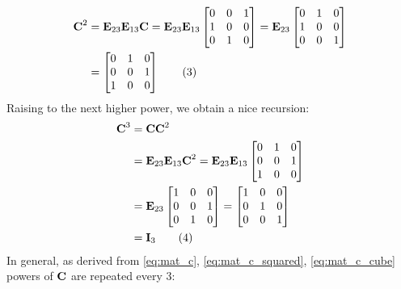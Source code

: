 \documentclass[a4paper]{article}
\begin{document}
\begin{align*}
\textbf{C}^2 &= \textbf{E}_{23}\textbf{E}_{13}\textbf{C} =   \textbf{E}_{23}\textbf{E}_{13}\begin{bmatrix} 
        0 & 0 & 1\\
        1 & 0 & 0\\
        0 & 1 & 0
    \end{bmatrix} 
= \textbf{E}_{23}
    \begin{bmatrix}
        0 & 1 & 0\\
        1 & 0 & 0\\
         0 & 0 & 1\\
    \end{bmatrix}\\
&= 
    \begin{bmatrix}
        0 & 1 & 0\\
        0 & 0 & 1\\
        1 & 0 & 0\\
    \end{bmatrix}
    \label{eq:mat_c_squared}
    \tag{3}
\end{align*}
Raising to the next higher power, we obtain a nice recursion:
\begin{align*}
    \textbf{C}^3 &= \textbf{C}\textbf{C}^2\\
    &= \textbf{E}_{23}\textbf{E}_{13}\textbf{C}^2 = \textbf{E}_{23}\textbf{E}_{13} \begin{bmatrix}
            0 & 1 & 0\\
            0 & 0 & 1\\
            1 & 0 & 0\\
        \end{bmatrix}\\
    &=\textbf{E}_{23} \begin{bmatrix}
            1 & 0 & 0\\
            0 & 0 & 1\\
            0 & 1 & 0\\
        \end{bmatrix}
    = \begin{bmatrix}
            1 & 0 & 0\\
            0 & 1 & 0\\
            0 & 0 & 1\\
        \end{bmatrix} \\
    &= \textbf{I}_3
    \label{eq:mat_c_cube}
    \tag{4}
\end{align*}
In general, as derived from \eqref{eq:mat_c}, \eqref{eq:mat_c_squared}, \eqref{eq:mat_c_cube} powers of $\textbf{C}$ are repeated every 3:
\end{document}
